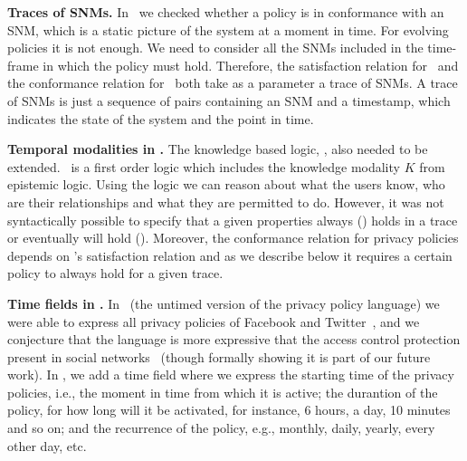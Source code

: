 \begin{inparaenum}[]
\item \textbf{Traces of SNMs.} In \fppf~we checked whether a policy is in conformance with an SNM, which is a static picture of the system at a moment in time. For evolving policies it is not enough. We need to consider all the SNMs included in the time-frame in which the policy must hold. Therefore, the satisfaction relation for \tkbl~and the conformance relation for \tppl~both take as a parameter a trace of SNMs. A trace of SNMs is just a sequence of pairs containing an SNM and a timestamp, which indicates the state of the system and the point in time.
  
\item \textbf{Temporal modalities in \tkbl.} The knowledge based logic, \kbl, also needed to be extended. \kbl~is a first order logic which includes the knowledge modality $K$ from epistemic logic. Using the logic we can reason about what the users know, who are their relationships and what they are permitted to do. However, it was not syntactically possible to specify that a given properties always (\al) holds in a trace or eventually will hold (\ev). Moreover, the conformance relation for privacy policies depends on \tkbl's satisfaction relation and as we describe below it requires a certain policy to always hold for a given trace.
  
\item \textbf{Time fields in \tppl.} In \ppl~(the untimed version of the privacy policy language) we were able to express all privacy policies of Facebook and Twitter~\cite{PS14fpp}, and we conjecture that the language is more expressive that the access control protection present in social networks~\cite{BFS+12rbaceehl,F11rbacppl} (though formally showing it is part of our future work). In \tppl, we add a time field where we express the starting time of the privacy policies, i.e., the moment in time from which it is active; the durantion of the policy, for how long will it be activated, for instance, 6 hours, a day, 10 minutes and so on; and the recurrence of the policy, e.g., monthly, daily, yearly, every other day, etc.

\end{inparaenum}

